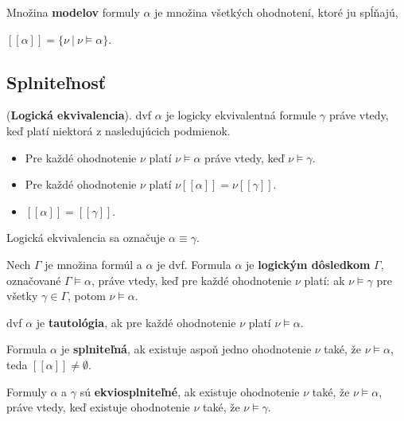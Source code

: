 \begin{definition}
    Množina \textbf{modelov} formuly $\alpha$ je množina všetkých ohodnotení, ktoré ju spĺňajú,
    \begin{center}
        $[[\alpha]] = \{\nu ~|~ \nu \models \alpha\}$.
    \end{center}
\end{definition}

\subsection{Splniteľnosť}\label{sec:propositional_logic:satisfiability}

\begin{definition}
    (\textbf{Logická ekvivalencia}). \Acrshort{dvf} $\alpha$ je logicky ekvivalentná formule $\gamma$ práve vtedy, keď platí niektorá z nasledujúcich podmienok.
    \begin{itemize}
        \item Pre každé ohodnotenie $\nu$ platí $\nu \models \alpha$ práve vtedy, keď $\nu \models \gamma$.
        \item Pre každé ohodnotenie $\nu$ platí $\nu[[\alpha]] = \nu[[\gamma]]$.
        \item $[[\alpha]] = [[\gamma]]$.
    \end{itemize}
    Logická ekvivalencia sa označuje $\alpha \equiv \gamma$.
\end{definition}

\begin{definition}
    Nech $\Gamma$ je množina formúl a $\alpha$ je \acrshort{dvf}. Formula $\alpha$ je \textbf{logickým dôsledkom} $\Gamma$, označované $\Gamma \models \alpha$, práve vtedy, keď pre každé ohodnotenie $\nu$ platí: ak $\nu \models \gamma$ pre všetky $\gamma \in \Gamma$, potom $\nu \models \alpha$.
\end{definition}

\begin{definition}
    \Acrshort{dvf} $\alpha$ je \textbf{tautológia}, ak pre každé ohodnotenie $\nu$ platí $\nu \models \alpha$.
\end{definition}

\begin{definition}
    Formula $\alpha$ je \textbf{splniteľná}, ak existuje aspoň jedno ohodnotenie $\nu$ také, že $\nu \models \alpha$, teda $[[\alpha]] \neq \emptyset$.
\end{definition}

\begin{definition}
    Formuly $\alpha$ a $\gamma$ sú \textbf{ekviosplniteľné}, ak existuje ohodnotenie $\nu$ také, že $\nu \models \alpha$, práve vtedy, keď existuje ohodnotenie $\nu$ také, že $\nu \models \gamma$.
\end{definition}

